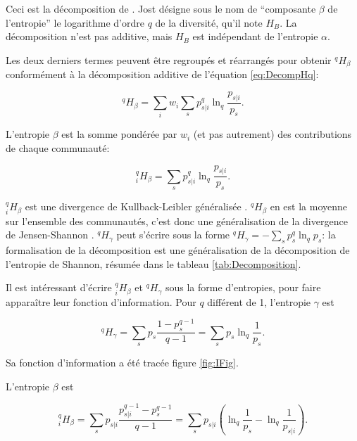 \documentclass[
  11pt,
  french,
  a4paper,
  extrafontsizes,onecolumn,openright
  ]{memoir}
\begin{document}
Ceci est la décomposition de \textcite{Jost2007}.
Jost désigne sous le nom de ``composante \(\beta\) de l'entropie'' le logarithme d'ordre \(q\) de la diversité, qu'il note \(H_B\).
La décomposition n'est pas additive, mais \(H_B\) est indépendant de l'entropie \(\alpha\).

Les deux derniers termes peuvent être regroupés et réarrangés pour obtenir \(^{q}\!H_{\beta}\) conformément à la décomposition additive de l'équation \eqref{eq:DecompHq}:

\begin{equation}
  \label{eq:ContributionBeta}
  ^{q}\!H_{\beta} = \sum_i{w_i\sum_s{p^q_{s|i}\ln_q\frac{p_{s|i}}{p_s}}}.
\end{equation}

L'entropie \(\beta\) est la somme pondérée par \(w_i\) (et pas autrement) des contributions de chaque communauté:

\begin{equation}
  \label{eq:PoidsHbetai}
  ^{q}_{i}\!H_{\beta}=\sum_s{p^q_{s|i}\ln_q\frac{p_{s|i}}{p_s}}.
\end{equation}

\(^{q}_{i}\!H_{\beta}\) est une divergence de Kullback-Leibler généralisée \autocite{Borland1998,Tsallis1998}.
\(^{q}\!H_{\beta}\) en est la moyenne sur l'ensemble des communautés, c'est donc une généralisation de la divergence de Jensen-Shannon \autocite{Marcon2014a}.
\(^{q}\!H_{\gamma}\) peut s'écrire sous la forme \(^{q}\!H_{\gamma} = -\sum_s{p^q_s}\ln_q{p_s}\): la formalisation de la décomposition est une généralisation de la décomposition de l'entropie de Shannon, résumée dans le tableau \ref{tab:Decomposition}.

Il est intéressant d'écrire \(^{q}_{i}\!H_{\beta}\) et \(^{q}\!H_{\gamma}\) sous la forme d'entropies, pour faire apparaître leur fonction d'information.
Pour \(q\) différent de 1, l'entropie \(\gamma\) est

\begin{equation}
  \label{eq:Hqgamma}
  ^{q}\!H_{\gamma} 
  = \sum_s{p_s\frac{1-p^{q-1}_s}{q-1}}
  = \sum_s{p_s\ln_q\frac{1}{p_s}}.
\end{equation}

Sa fonction d'information a été tracée figure \ref{fig:IFig}.

L'entropie \(\beta\) est

\begin{equation}
  \label{eq:Hqbeta}
  ^{q}_{i}\!H_{\beta} 
  = \sum_s{p_{s|i}\frac{p^{q-1}_{s|i}-p^{q-1}_s}{q-1}}
  = \sum_s{p_{s|i}\left(\ln_q\frac{1}{p_s}-\ln_q\frac{1}{p_{s|i}}\right)}.
\end{equation}
\end{document}

